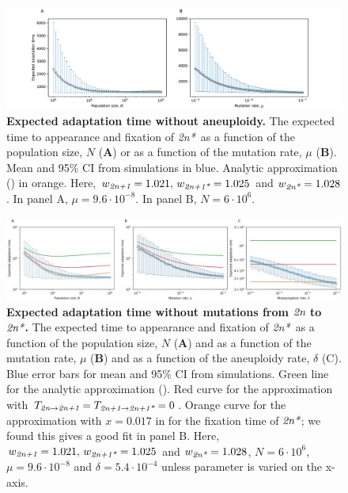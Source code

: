 \documentclass[12pt]{extarticle}
\newcommand{\euwt}{\emph{2n}}
\newcommand{\anwt}{\emph{2n+1}}
\newcommand{\eumt}{\emph{2n*}}
\newcommand{\anmt}{\emph{2n+1*}}
\begin{document}
 \begin{figure}[h!]
 \centering
 \includegraphics[width=\textwidth]{../figures/figgrid_noaneu.pdf}
 \caption{\textbf{Expected adaptation time without aneuploidy.}
  The expected time to appearance and fixation of \eumt\ as a function of the population size, $N$ (\textbf{A}) or as a function of the mutation rate, $\mu$ (\textbf{B}). Mean and 95\% CI from simulations in blue. Analytic approximation () in orange. Here, $w_\anwt=1.021,\,   w_\anmt=1.025$ and $w_\eumt=1.028$. In panel A, $\mu=9.6\cdot 10^{-8}$. In panel B, $N=6\cdot 10^6$.
  }
 \label{fig:only mut}
 \end{figure}
 
 
 \begin{figure}[h!]
 \includegraphics[width=1\textwidth]{../figures/figgrid_nodirectmut_ylog_uncorr0.jpg}
 \caption{\textbf{Expected adaptation time without mutations from $\euwt$ to $\eumt$.}
  The expected time to appearance and fixation of \eumt\ as a function of the population size, $N$ (\textbf{A}) and as a function of the mutation rate, $\mu$ (\textbf{B}) and as a function of the aneuploidy rate, $\delta$ ({C}). Blue error bars for mean and 95\% CI from simulations. Green line for the analytic approximation (). %
  Red curve for the approximation with $T_{\euwt \to \anwt}=T_{\anwt \to \anmt}=0$. 
  Orange curve for the approximation with $x=0.017$ in  for the fixation time of $\eumt$; we found this gives a good fit in panel B.
  Here, $w_\anwt=1.021,\, w_\anmt=1.025$ and $w_\eumt=1.028$, $N=6\cdot 10^6$,\, $\mu=9.6\cdot 10^{-8}$ and $\delta=5.4\cdot 10^{-4}$ unless parameter is varied on the x-axis.
  }
 \label{fig:no direct mut}
 \end{figure}
 
\end{document}
